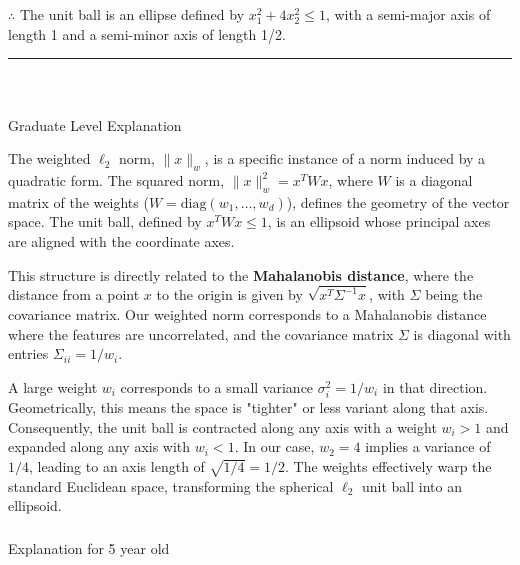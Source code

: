 \documentclass{article}
\begin{document}
\subsubsection*{\normalfont}{$\therefore$ The unit ball is an ellipse defined by $x_1^2 + 4x_2^2 \le 1$, with a semi-major axis of length 1 and a semi-minor axis of length 1/2.}

\noindent\rule{\textwidth}{0.4pt}\\

\newpage

\subsubsection*{\normalfont}{Graduate Level Explanation}

\parbox{\textwidth}{
The weighted $\ell_2$ norm, $\|x\|_w$, is a specific instance of a norm induced by a quadratic form. The squared norm, $\|x\|_w^2 = x^T W x$, where $W$ is a diagonal matrix of the weights ($W = \text{diag}(w_1, \dots, w_d)$), defines the geometry of the vector space. The unit ball, defined by $x^T W x \le 1$, is an ellipsoid whose principal axes are aligned with the coordinate axes.

This structure is directly related to the \textbf{Mahalanobis distance}, where the distance from a point $x$ to the origin is given by $\sqrt{x^T \Sigma^{-1} x}$, with $\Sigma$ being the covariance matrix. Our weighted norm corresponds to a Mahalanobis distance where the features are uncorrelated, and the covariance matrix $\Sigma$ is diagonal with entries $\Sigma_{ii} = 1/w_i$.

A large weight $w_i$ corresponds to a small variance $\sigma_i^2 = 1/w_i$ in that direction. Geometrically, this means the space is "tighter" or less variant along that axis. Consequently, the unit ball is contracted along any axis with a weight $w_i > 1$ and expanded along any axis with $w_i < 1$. In our case, $w_2=4$ implies a variance of $1/4$, leading to an axis length of $\sqrt{1/4} = 1/2$. The weights effectively warp the standard Euclidean space, transforming the spherical $\ell_2$ unit ball into an ellipsoid.
}
\subsubsection*{\normalfont}{Explanation for 5 year old}
\end{document}
